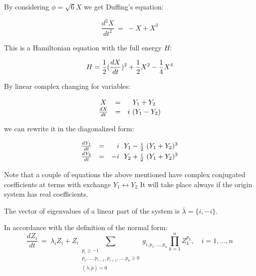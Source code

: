 By considering $\phi = \sqrt{6} X$ we get Duffing's equation:

\begin{equation}
\label{eq-duffing}
\frac{d^{2}X}{dt^2} \ = \ - X + X^3
\end{equation}

This is a Hamiltonian equation with the full energy $H$:

\begin{equation}
\label{H-duffing}
H = {1 \over 2}(\frac{dX}{dt})^2 + {1 \over 2} X^2 - {1 \over 4} X^4
\end{equation}


By linear complex changing for variables:

\begin{equation}
\label{line-norm}
\begin{array}{ccc}
X & = & Y_1 + Y_2 \\
\frac{\mathstrut dX}{dt}& = & i \ (Y_1 - Y_2)
\end{array}
\end{equation}

\noindent
we can rewrite it in the diagonalized form:

\begin{equation}
\label{planar-duff}
\begin{array}{lcrl}
\frac{\mathstrut dY_1}{\mathstrut dt}& = &  i &\!\! Y_1 - {i \over 2}
                                                       \ (Y_1 +Y_2)^3\\
\frac{\mathstrut dY_2}{\mathstrut dt}& = & -i &\!\! Y_2 + {i \over 2}
                                                       \ (Y_1 +Y_2)^3
\end{array}
\end{equation}


\noindent
Note that a couple of equations the above mentioned have complex conjugated 
coefficients at terms with exchange $Y_1 \leftrightarrow Y_2$ It will 
take place always if the origin system has real coefficients. 

   The vector of eigenvalues of 
a linear part of the system is $\overline{\lambda} = \{i,-i\}$.

In accordance with the definition of the normal form: 
$$
\frac{dZ_i}{dt} \ = \ \lambda_iZ_i + Z_i
                                   \!\!\!\!\!\!\!\!\!\!\!\!\!\!\!\!\!
                                   \!\!\!\!\!\!\!\!\!\!\!\!\!\!\!\!\!
                           \sum_{\begin{array}{c}
                                 p_i \geq -1 \\
                           p_1,\ldots,p_{i-1},p_{i+1},\ldots,p_n \geq 0 \\
                           (\overline{\lambda},\overline{p}) = 0 
                                              \end{array}}
                                   \!\!\!\!\!\!\!\!\!\!\!\!\!\!\!\!
                                   \!\!\!\!\!\!\!\!\!\!\!\!\!\!\!\!
                               g_{i,p_1,\ldots,p_n}
                               \prod_{k = 1}^{n} Z_k^{p_k},            
\quad i=1,\ldots ,n
$$

